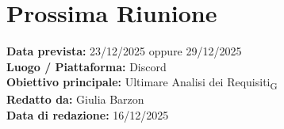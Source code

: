 \documentclass[a4paper,12pt]{article}
\newcommand{\gls}[1]{#1\textsubscript{G}}
\begin{document}
\section*{ Prossima Riunione}
\textbf{Data prevista:} 23/12/2025 oppure 29/12/2025 \\
\textbf{Luogo / Piattaforma:} Discord \\
\textbf{Obiettivo principale:} Ultimare \gls{Analisi dei Requisiti} \\


\textbf{Redatto da:} Giulia Barzon \\
\textbf{Data di redazione:} 16/12/2025
\end{document}
